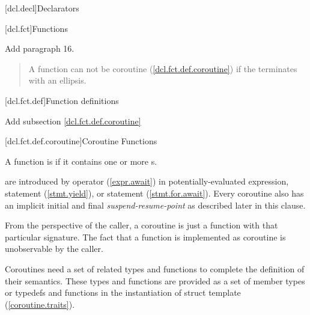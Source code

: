 
[dcl.decl]{Declarators}

\setcounter{section}{3}
\setcounter{subsection}{4}
[dcl.fct]{Functions}%

Add paragraph 16.

\begin{quote}
\setcounter{Paras}{15}
\pnum
A function can not be coroutine (\ref{dcl.fct.def.coroutine}) if the  terminates with an ellipsis.
\end{quote}

\setcounter{section}{3}
[dcl.fct.def]{Function definitions}

Add subsection \ref{dcl.fct.def.coroutine}

\setcounter{subsection}{3}
[dcl.fct.def.coroutine]{Coroutine Functions}


\pnum
A function is  if it contains
one or more s. 

\pnum
{} are introduced by  operator (\ref{expr.await}) in potentially-evaluated expression,
 statement (\ref{stmt.yield}), 
or  statement (\ref{stmt.for.await}). Every coroutine
also has an implicit initial and final \textit{suspend-resume-point} as described later in this clause. 

\pnum
\enternote
From the perspective of the caller, a coroutine is just a function with that particular signature. The fact that a function is implemented as coroutine is unobservable by the caller. 
\exitnote

\pnum
Coroutines need a set of related types and functions
to complete the definition of their semantics.
These types and functions are provided as a set of member types or typedefs
and functions in the instantiation of struct template
 (\ref{coroutine.traits}). 

